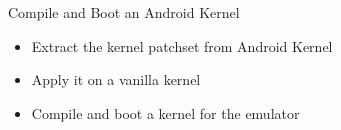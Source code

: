 \setuplabframe
{Compile and Boot an Android Kernel}
{
  \begin{itemize}
  \item Extract the kernel patchset from Android Kernel
  \item Apply it on a vanilla kernel
  \item Compile and boot a kernel for the emulator
  \end{itemize}
}